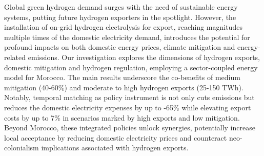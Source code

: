 




Global green hydrogen demand surges with the need of sustainable energy systems, putting future hydrogen exporters in the spotlight. However, the installation of on-grid hydrogen electrolysis for export, reaching magnitudes multiple times of the domestic electricity demand, introduces the potential for profound impacts on both domestic energy prices, climate mitigation and energy-related emissions. Our investigation explores the dimensions of hydrogen exports, domestic mitigation and hydrogen regulation, employing a sector-coupled energy model for Morocco. The main results underscore the co-benefits of medium mitigation (40-60\%) and moderate to high hydrogen exports (25-150 TWh). Notably, temporal matching as policy instrument is not only cuts emissions but reduces the domestic electricity expenses by up to -65\% while elevating export costs by up to 7\% in scenarios marked by high exports and low mitigation. Beyond Morocco, these integrated policies unlock synergies, potentially increase local acceptance by reducing domestic electricity prices and counteract neo-colonialism implications associated with hydrogen exports.

